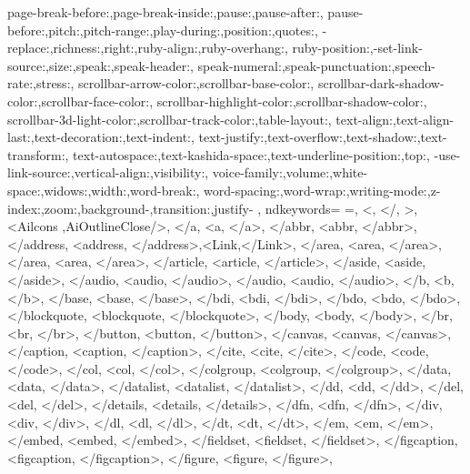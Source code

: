 {{            page-break-before:,page-break-inside:,pause:,pause-after:,
            pause-before:,pitch:,pitch-range:,play-during:,position:,quotes:,
            -replace:,richness:,right:,ruby-align:,ruby-overhang:,
            ruby-position:,-set-link-source:,size:,speak:,speak-header:,
            speak-numeral:,speak-punctuation:,speech-rate:,stress:,
            scrollbar-arrow-color:,scrollbar-base-color:,
            scrollbar-dark-shadow-color:,scrollbar-face-color:,
            scrollbar-highlight-color:,scrollbar-shadow-color:,
            scrollbar-3d-light-color:,scrollbar-track-color:,table-layout:,
            text-align:,text-align-last:,text-decoration:,text-indent:,
            text-justify:,text-overflow:,text-shadow:,text-transform:,
            text-autospace:,text-kashida-space:,text-underline-position:,top:,
            -use-link-source:,vertical-align:,visibility:,
            voice-family:,volume:,white-space:,widows:,width:,word-break:,
            word-spacing:,word-wrap:,writing-mode:,z-index:,zoom:,background-,transition:,justify-
            },  
            ndkeywords={
            =, <, </, >,<Ailcons ,AiOutlineClose/>,
            </a, <a, </a>,
            </abbr, <abbr, </abbr>,
            </address, <address, </address>,<Link,</Link>,
            </area, <area, </area>,
            </area, <area, </area>,
            </article, <article, </article>,
            </aside, <aside, </aside>,
            </audio, <audio, </audio>,
            </audio, <audio, </audio>,
            </b, <b, </b>,
            </base, <base, </base>,
            </bdi, <bdi, </bdi>,
            </bdo, <bdo, </bdo>,
            </blockquote, <blockquote, </blockquote>,
            </body, <body, </body>,
            </br, <br, </br>,
            </button, <button, </button>,
            </canvas, <canvas, </canvas>,
            </caption, <caption, </caption>,
            </cite, <cite, </cite>,
            </code, <code, </code>,
            </col, <col, </col>,
            </colgroup, <colgroup, </colgroup>,
            </data, <data, </data>,
            </datalist, <datalist, </datalist>,
            </dd, <dd, </dd>,
            </del, <del, </del>,
            </details, <details, </details>,
            </dfn, <dfn, </dfn>,
            </div, <div, </div>,
            </dl, <dl, </dl>,
            </dt, <dt, </dt>,
            </em, <em, </em>,
            </embed, <embed, </embed>,
            </fieldset, <fieldset, </fieldset>,
            </figcaption, <figcaption, </figcaption>,
            </figure, <figure, </figure>,
}}
